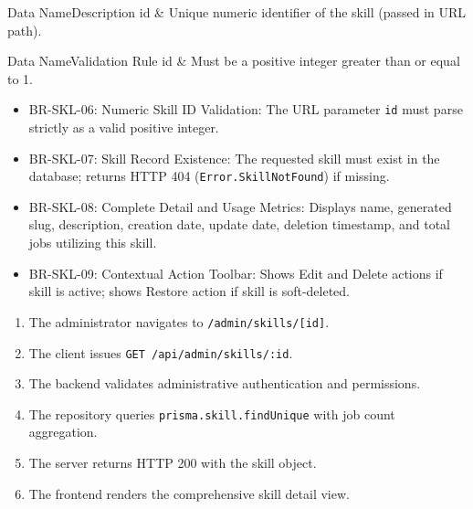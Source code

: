\begin{specdatatable}{Data Name}{Description}
id & Unique numeric identifier of the skill (passed in URL path).\\ \hline
\end{specdatatable}

\begin{specdatatable}{Data Name}{Validation Rule}
id & Must be a positive integer greater than or equal to 1.\\ \hline
\end{specdatatable}

\begin{itemize}[leftmargin=1.6em,topsep=3pt,itemsep=2pt,parsep=0pt,label=$\bullet$]\brrulelist
    \item BR-SKL-06: Numeric Skill ID Validation: The URL parameter \texttt{id} must parse strictly as a valid positive integer.
    \item BR-SKL-07: Skill Record Existence: The requested skill must exist in the database; returns HTTP 404 (\texttt{Error.SkillNotFound}) if missing.
    \item BR-SKL-08: Complete Detail and Usage Metrics: Displays name, generated slug, description, creation date, update date, deletion timestamp, and total jobs utilizing this skill.
    \item BR-SKL-09: Contextual Action Toolbar: Shows Edit and Delete actions if skill is active; shows Restore action if skill is soft-deleted.
\end{itemize}

\begin{enumerate}[leftmargin=1.6em,topsep=3pt,itemsep=2pt,parsep=0pt]
    \item The administrator navigates to \texttt{/admin/skills/[id]}.
    \item The client issues \texttt{GET /api/admin/skills/:id}.
    \item The backend validates administrative authentication and permissions.
    \item The repository queries \texttt{prisma.skill.findUnique} with job count aggregation.
    \item The server returns HTTP 200 with the skill object.
    \item The frontend renders the comprehensive skill detail view.
\end{enumerate}

